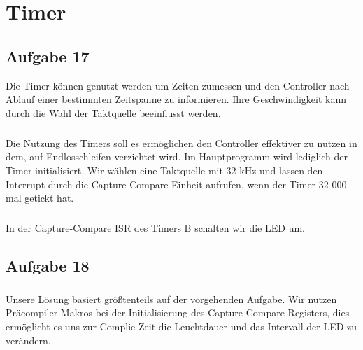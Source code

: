 \chapter{Timer}

\section*{Aufgabe 17}
Die Timer können genutzt werden um Zeiten zumessen und den Controller nach Ablauf einer bestimmten Zeitspanne zu informieren. Ihre Geschwindigkeit kann durch die Wahl der Taktquelle beeinflusst werden.


\paragraph*{}
Die Nutzung des Timers soll es ermöglichen den Controller effektiver zu nutzen in dem, auf Endlosschleifen verzichtet wird. Im Hauptprogramm wird lediglich der Timer initialisiert. Wir wählen eine Taktquelle mit 32 kHz und lassen den Interrupt durch die Capture-Compare-Einheit aufrufen, wenn der Timer 32 000 mal getickt hat. \\



\paragraph*{}
In der Capture-Compare ISR des Timers B schalten wir die LED um. \\



\section*{Aufgabe 18}

\paragraph*{}
Unsere Lösung basiert größtenteils auf der vorgehenden Aufgabe. Wir nutzen Präcompiler-Makros bei der Initialisierung des Capture-Compare-Registers, dies ermöglicht es uns zur Complie-Zeit die Leuchtdauer und das Intervall der LED zu verändern. \\





